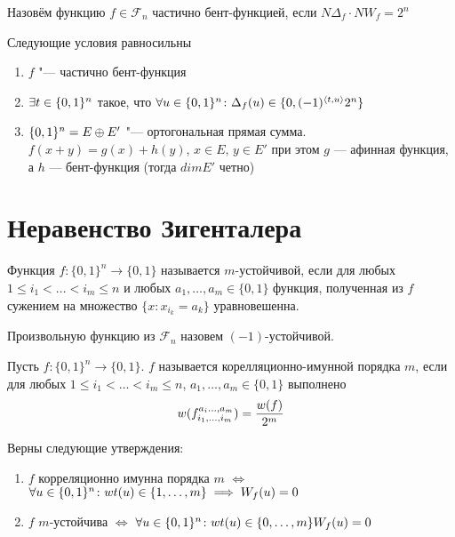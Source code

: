 \begin{definition}
Назовём функцию $f \in \mathscr{F}_n$ частично бент-функцией, если 
$N \Delta_f \cdot N W_f = 2^n$
\end{definition}

\begin{theorem}
Следующие условия равносильны
\begin{enumerate}
\item $f$ "--- частично бент-функция
\item $\exists t \in \{0,1\}^n$ такое, что $\forall u \in \{0,1\}^n \colon
    \Delta_f (u) \in \{0, (-1)^{\langle t,u \rangle} 2^n\}$
\item $\{0,1\}^n = E \oplus E'$ "--- ортогональная прямая сумма. 
$f(x+y) = g(x) + h(y)$, $x \in E,\, y\in E'$ при этом 
 $g$ --- афинная функция, а $h$ --- бент-функция (тогда $dim E'$ четно)
\end{enumerate}
\end{theorem}

\section{Неравенство Зигенталера}

\begin{definition}
Функция $f: \{0,1\}^n \to \{0,1\}$ называется $m$-устойчивой, если 
для любых $1 \le i_1 < \ldots < i_m \le n$ и любых $a_1, \ldots, a_m 
\in \{0,1\}$ функция, полученная из $f$ сужением на множество 
$\{x \colon x_{i_k} = a_k\}$ уравновешенна. 

Произвольную функцию из $\mathscr{F}_n$ назовем $(-1)$-устойчивой.
\end{definition}

\begin{definition}
Пусть $f: \{0,1\}^n \to \{0,1\}$. $f$ называется корелляционно-имунной
порядка $m$, если
 для любых $1 \le i_1 < \ldots < i_m \le n$, $a_1, \ldots, a_m \in \{0,1\}$
 выполнено
 $$w(f_{i_1, \ldots, i_m}^{a_i \ldots, a_m}) = {w(f) \over 2^m}$$
\end{definition}

\begin{proposition}
Верны следующие утверждения:
\begin{enumerate}
\item $f$ корреляционно имунна порядка $m$ $\iff$ $\forall u \in \{0,1\}^n 
\colon wt(u) \in \{1, \ldots, m\} \implies W_f(u)=0$
\item $f$ $m$-устойчива $\iff$ $\forall u \in \{0,1\}^n \colon
  wt(u) \in \{0, \ldots, m\} W_f(u)=0$
\end{enumerate}
\end{proposition}

